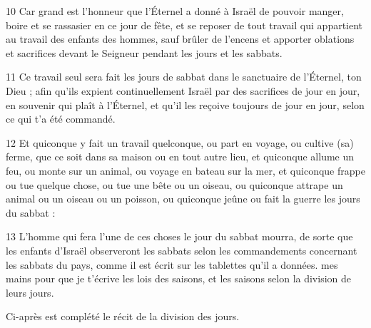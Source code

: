 \par 10 Car grand est l'honneur que l'Éternel a donné à Israël de pouvoir manger, boire et se rassasier en ce jour de fête, et se reposer de tout travail qui appartient au travail des enfants des hommes, sauf brûler de l'encens et apporter oblations et sacrifices devant le Seigneur pendant les jours et les sabbats.
\par 11 Ce travail seul sera fait les jours de sabbat dans le sanctuaire de l'Éternel, ton Dieu ; afin qu'ils expient continuellement Israël par des sacrifices de jour en jour, en souvenir qui plaît à l'Éternel, et qu'il les reçoive toujours de jour en jour, selon ce qui t'a été commandé.
\par 12 Et quiconque y fait un travail quelconque, ou part en voyage, ou cultive (sa) ferme, que ce soit dans sa maison ou en tout autre lieu, et quiconque allume un feu, ou monte sur un animal, ou voyage en bateau sur la mer, et quiconque frappe ou tue quelque chose, ou tue une bête ou un oiseau, ou quiconque attrape un animal ou un oiseau ou un poisson, ou quiconque jeûne ou fait la guerre les jours du sabbat :
\par 13 L'homme qui fera l'une de ces choses le jour du sabbat mourra, de sorte que les enfants d'Israël observeront les sabbats selon les commandements concernant les sabbats du pays, comme il est écrit sur les tablettes qu'il a données. mes mains pour que je t'écrive les lois des saisons, et les saisons selon la division de leurs jours.
\par    
\par     Ci-après est complété le récit de la division des jours.

